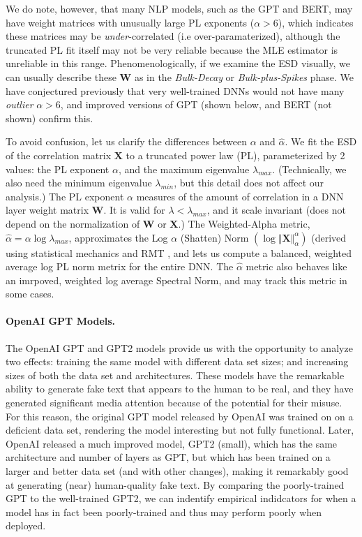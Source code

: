 We do note, however, that many NLP models, such as the GPT and BERT, may have weight matrices with unusually large PL exponents
($\alpha>6$), which indicates these matrices may be \emph{under}-correlated (i.e over-paramaterized), although the truncated PL fit
itself may not be very reliable because the MLE estimator is unreliable in this range.  Phenomenologically, if we examine
the ESD visually, we can usually describe these $\mathbf{W}$ as in the \emph{Bulk-Decay} or \emph{Bulk-plus-Spikes} phase\cite{MM}.
We have conjectured previously that very well-trained DNNs would not have many \emph{outlier} $\alpha>6$, 
and improved versions of GPT (shown below, and BERT (not shown) confirm this.

To avoid confusion, let us clarify the differences between $\alpha$ and $\hat{\alpha}$.  
We fit the ESD of the correlation matrix $\mathbf{X}$ to a truncated power law (PL), parameterized by 2 values:
the PL exponent $\alpha$, and the maximum eigenvalue $\lambda_{max}$.  (Technically, we also need the minimum
eigenvalue $\lambda_{min}$, but this detail does not affect our analysis.)
The PL exponent $\alpha$ measures of the 
amount of correlation in a DNN layer weight matrix $\mathbf{W}$.  It is valid for $\lambda<\lambda_{max}$, and
it scale invariant (does not depend on the normalization of $\mathbf{W}$ or $\mathbf{X}$.)
The Weighted-Alpha metric, $\hat{\alpha}=\alpha\log\lambda_{max}$, approximates the Log $\alpha$ (Shatten) Norm 
$(\log\Vert\mathbf{X}\Vert^{\alpha}_{\alpha})$ (derived using statistical mechanics and RMT , 
and lets us compute a balanced, weighted average log PL norm metrix for the entire DNN.  
The $\hat{\alpha}$ metric also behaves like an imrpoved, weighted log average Spectral Norm, and may track this metric in some cases.

\paragraph{OpenAI GPT Models.}

The OpenAI GPT and GPT2 models provide us with the opportunity to analyze two effects: training the same model with different data set sizes; and increasing sizes of both the data set and architectures.
These models have the remarkable ability to generate fake text that appears to the human to be real, and they have generated significant media attention because of the potential for their misuse.
For this reason, the original GPT model released by OpenAI was trained on on a deficient data set, rendering the model interesting but not fully functional.  
Later, OpenAI released a much improved model, GPT2 (small), which has the same architecture and number of layers as GPT, but which has been trained on a larger and better data set (and with other changes), making it remarkably good at generating (near) human-quality fake text.  
%
By comparing the poorly-trained GPT to the well-trained GPT2, we can indentify empirical indidcators for when a model has in fact been poorly-trained and thus may perform poorly when deployed.

